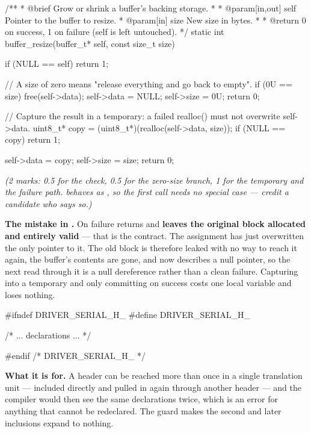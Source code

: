 \begin{ccode}
/**
 * @brief Grow or shrink a buffer's backing storage.
 *
 * @param[in,out] self Pointer to the buffer to resize.
 * @param[in] size New size in bytes.
 *
 * @return 0 on success, 1 on failure (self is left untouched).
 */
static int buffer_resize(buffer_t* self, const size_t size)
{
    if (NULL == self) { return 1; }

    // A size of zero means "release everything and go back to empty".
    if (0U == size)
    {
        free(self->data);
        self->data = NULL;
        self->size = 0U;
        return 0;
    }

    // Capture the result in a temporary: a failed realloc() must not overwrite self->data.
    uint8_t* copy = (uint8_t*)(realloc(self->data, size));
    if (NULL == copy) { return 1; }

    self->data = copy;
    self->size = size;
    return 0;
}
\end{ccode}

{\itshape (2 marks: 0.5 for the  check, 0.5 for the zero-size branch, 1 for the
temporary and the failure path.  behaves as , so the
first call needs no special case --- credit a candidate who says so.)\par}

\medskip
\textbf{The mistake in .} On failure 
returns  and \textbf{leaves the original block allocated and entirely valid} --- that is
the contract. The assignment has just overwritten the only pointer to it. The old block is therefore
leaked with no way to reach it again, the buffer's contents are gone, and  now
describes a null pointer, so the next read through it is a null dereference rather than a clean
failure. Capturing into a temporary and only committing on success costs one local variable and
loses nothing. 

\begin{ccode}
#ifndef DRIVER_SERIAL_H_
#define DRIVER_SERIAL_H_

/* ... declarations ... */

#endif /* DRIVER_SERIAL_H_ */
\end{ccode}

\noindent\textbf{What it is for.} A header can be reached more than once in a single translation
unit --- included directly and pulled in again through another header --- and the compiler would
then see the same declarations twice, which is an error for anything that cannot be redeclared. The
guard makes the second and later inclusions expand to nothing.

